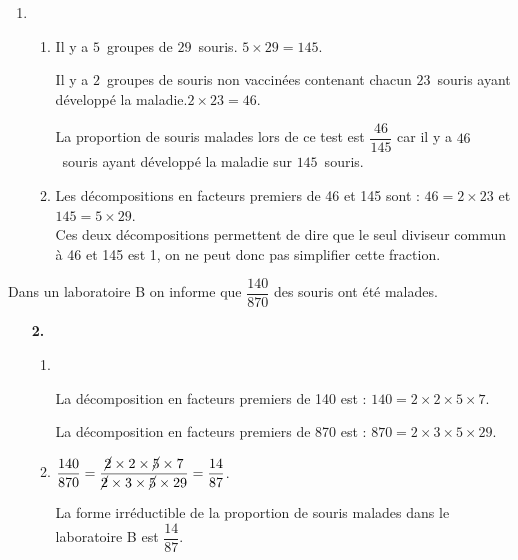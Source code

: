 \documentclass[10pt]{article}
\begin{document}
\begin{enumerate}
\item 
	\begin{enumerate}
		\item Il y a $5$~groupes de $29$~souris. $5\times29=145$.
		
Il y a $2$~groupes de souris non vaccinées contenant chacun $23$~souris ayant développé la maladie.$2\times23=46$.
		
		 La proportion de souris malades lors de ce test est $\dfrac{46}{145}$ car il y a $46$~souris ayant développé la maladie sur $145$~souris.
		\item Les décompositions en facteurs premiers de 46 et 145 sont : \quad $46=2\times23$ et $145=5\times29$. \\
		Ces deux décompositions permettent de dire que le seul diviseur commun à 46 et 145 est 1, on ne peut donc pas simplifier cette fraction.
	\end{enumerate}	
\end{enumerate}
		
Dans un laboratoire B on informe que $\dfrac{140}{870}$ des souris ont été malades.

\begin{enumerate}		
\item[\textbf{2.}] 
	\begin{enumerate}
		\item  ~	
	\vspace{-0.5cm}
	\hspace{-0.3cm}%

\vspace{0.4cm}

La décomposition en facteurs premiers de 140 est : \quad $140=2\times2\times5\times7$.

\hspace{-0.3cm}%

\vspace{0.2cm}

La décomposition en facteurs premiers de 870 est : \quad $870 = 2 \times 3\times 5 \times 29$.
		\item $\dfrac{140}{870}=\dfrac{\cancel{2}\times2\times\cancel{5}\times7}{\cancel{2}\times3\times\cancel{5}\times29} = \dfrac{14}{87}$.
		
La forme irréductible de la proportion de souris malades dans le laboratoire B est $\dfrac{14}{87}$.
	\end{enumerate}
\end{enumerate}

\vspace{0,5cm}
\end{document}
